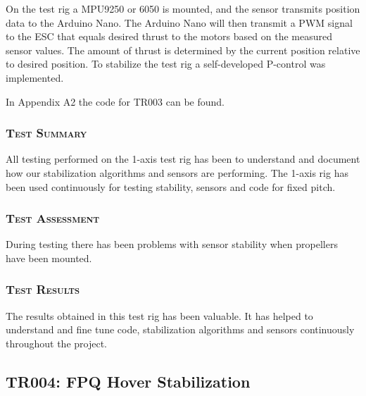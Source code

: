 On the test rig a MPU9250 or 6050 is mounted, and the sensor transmits position data to the Arduino Nano. The Arduino Nano will then transmit a PWM signal to the ESC that equals desired thrust to the motors based on the measured sensor values. The amount of thrust is determined by the current position relative to desired position. To stabilize the test rig a self-developed P-control was implemented. 

In Appendix A2 the code for TR003 can be found. 

\subsubsection*{\textsc{\medium Test Summary}}
All testing performed on the 1-axis test rig has been to understand and document how our stabilization algorithms and sensors are performing. The 1-axis rig has been used continuously for testing stability, sensors and code for fixed pitch. 

\subsubsection*{\textsc{\medium Test Assessment}}
During testing there has been problems with sensor stability when propellers have been mounted.

\subsubsection*{\textsc{\medium Test Results}}

The results obtained in this test rig has been valuable. It has helped to understand and fine tune code, stabilization algorithms and sensors continuously throughout the project.


\newpage

\subsection{TR004: FPQ Hover Stabilization}
         {}
